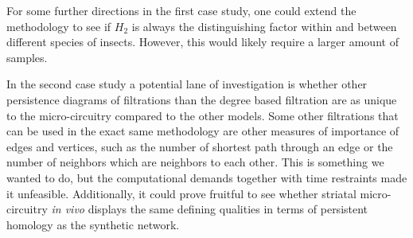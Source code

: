 For some further directions in the first case study, one could extend the methodology to see if $H_{2}$ is always the distinguishing factor within and between different species of insects. However, this would likely require a larger amount of samples.

In the second case study a potential lane of investigation is whether other persistence diagrams of filtrations than the degree based filtration are as unique to the micro-circuitry compared to the other models. Some other filtrations that can be used in the exact same methodology are other measures of importance of edges and vertices, such as the number of shortest path through an edge or the number of neighbors which are neighbors to each other. This is something we wanted to do, but the computational demands together with time restraints made it unfeasible. Additionally, it could prove fruitful to see whether striatal micro-circuitry \textit{in vivo} displays the same defining qualities in terms of persistent homology as the synthetic network.

